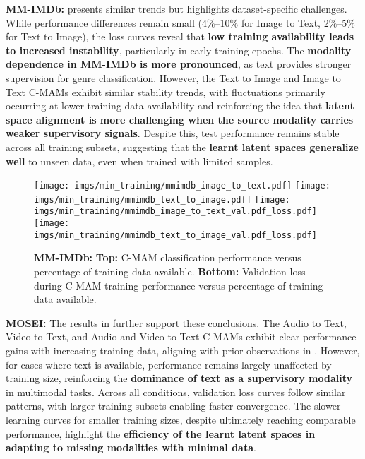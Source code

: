 \textbf{MM-IMDb:}  presents similar trends but highlights dataset-specific challenges. While performance differences remain small (4\%–10\% for Image to Text, 2\%–5\% for Text to Image), the loss curves reveal that \textbf{low training availability leads to increased instability}, particularly in early training epochs. The \textbf{modality dependence in MM-IMDb is more pronounced}, as text provides stronger supervision for genre classification. However, the Text to Image and Image to Text C-MAMs exhibit similar stability trends, with fluctuations primarily occurring at lower training data availability and reinforcing the idea that \textbf{latent space alignment is more challenging when the source modality carries weaker supervisory signals}. Despite this, test performance remains stable across all training subsets, suggesting that the \textbf{learnt latent spaces generalize well} to unseen data, even when trained with limited samples.

\begin{figure}[h!]
    \centering
    \texttt{[image: imgs/min\_training/mmimdb\_image\_to\_text.pdf]}
    \texttt{[image: imgs/min\_training/mmimdb\_text\_to\_image.pdf]}
    \texttt{[image: imgs/min\_training/mmimdb\_image\_to\_text\_val.pdf\_loss.pdf]}
    \texttt{[image: imgs/min\_training/mmimdb\_text\_to\_image\_val.pdf\_loss.pdf]}
    \caption{\textbf{MM-IMDb: } \textbf{Top:} C-MAM classification performance versus percentage of training data available. \textbf{Bottom:} Validation loss during C-MAM training performance versus percentage of training data available.}
    \label{fig:mmimdb_min_training}
\end{figure}

\textbf{MOSEI:} The results in  further support these conclusions. The Audio to Text, Video to Text, and Audio and Video to Text C-MAMs exhibit clear performance gains with increasing training data, aligning with prior observations in . However, for cases where text is available, performance remains largely unaffected by training size, reinforcing the \textbf{dominance of text as a supervisory modality} in multimodal tasks. Across all conditions, validation loss curves follow similar patterns, with larger training subsets enabling faster convergence. The slower learning curves for smaller training sizes, despite ultimately reaching comparable performance, highlight the \textbf{efficiency of the learnt latent spaces in adapting to missing modalities with minimal data}.


